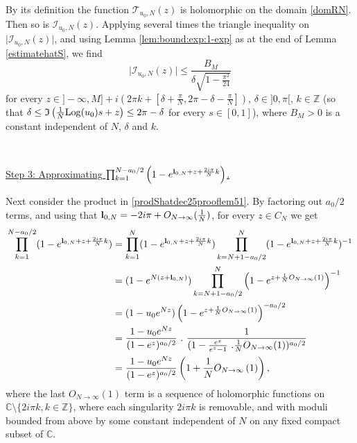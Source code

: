 \documentclass[11pt]{amsart}
\newcommand{\mc}{\mathbb{C}}
\newcommand{\mz}{\mathbb{Z}}
\newcommand{\bl}{{\bf l}}
\newcommand{\Log}{{\rm Log}}
\newcommand{\ra}{\rightarrow}
\begin{document}
{By its definition the function ${\mathcal{T}_{u_0,N}(z)}$ is holomorphic on the domain \eqref{domRN}. Then so is ${\mathcal{I}_{u_0,N}(z)}$. Applying several times the triangle inequality on  $\textstyle \vert {\mathcal{I}_{u_0,N}(z)} \vert$, and using Lemma \ref{lem:bound:exp:1-exp} as at the end of Lemma \ref{estimatehatS}, we find
\begin{equation}\label{majorjanv26_2} \vert {\mathcal{I}_{u_0,N}(z)}\vert  \leq  \dfrac{B_M}{\delta\sqrt{1- \frac{\pi^2}{24}}}
\end{equation}
for every $\textstyle z\in ]-\infty,M] + i(2\pi k + [\delta+\frac{\pi}{N}, 2\pi-\delta - \frac{\pi}{N}])$, $\textstyle \delta\in ]0,\pi[$, $k\in \mz$ (so that $\textstyle \delta \leq \mathfrak{I}\left(\frac{1}{N}\Log(u_{0})s +z\right) \leq 2\pi -\delta$ for every $s\in [0,1]$), where $B_M>0$ is a constant independent of $N$, $\delta$ and $k$.


\

\underline{Step 3: Approximating $\textstyle \prod_{k=1}^{N-a_0/2}\left(1-e^{\bl_{0,N} + z+\frac{2i\pi}{N}k}\right)$.}

Next consider the product in \eqref{prodShatdec25prooflem51}. By factoring out 
$a_0/2$
 terms, and using that $\textstyle\bl_{0,N} = -2i\pi + O_{N\ra \infty}(\frac{1}{N})$, for every $z\in C_N$ we get
\begin{align}
\prod_{k=1}^{N-a_0/2}(1-e^{\bl_{0,N} + z+\frac{2i\pi}{N}k}) & =  \prod_{k=1}^{N}(1-e^{\bl_{0,N} + z+\frac{2i\pi}{N}k}) \prod_{k=N+1-a_0/2}^{N}(1-e^{\bl_{0,N} + z+\frac{2i\pi}{N}k})^{-1}\notag\\
& =  (1-e^{N(z+\bl_{0,N})}) \prod_{k=N+1-a_0/2}^{N}\left(1-e^{z+ \frac{1}{N}O_{N\ra \infty}(1)}\right)^{-1} \notag \\
& = (1-u_0 e^{Nz}) \left(1-e^{z+ \frac{1}{N} O_{N\ra \infty}(1)}\right)^{-a_0/2} \notag \\
& = \frac{1-u_0 e^{Nz}}{(1-e^{z})^{a_0/2}} \ .\ \frac{1}{(1-\frac{e^{z}}{e^z-1}\ . \frac{1}{N}O_{N\ra \infty}(1))^{a_0/2}}\notag \\ & = \frac{1-u_0 e^{Nz}}{(1-e^{z})^{a_0/2}} \left(1+ \frac{1}{N}O_{N\ra \infty}\left(1\right)\right), \label{facterrmars25}
\end{align}
where the last $\textstyle O_{N\ra \infty}(1)$ term is a sequence of holomorphic functions on $\mc\setminus \{2i\pi k, k\in \mz\}$, where each singularity $2i\pi k$ is removable, and with moduli bounded from above by some constant independent of $N$ on any fixed compact subset of $\mc$.
\smallskip

}
\end{document}
